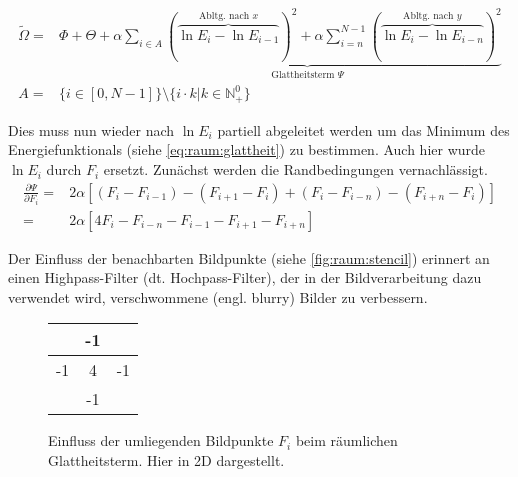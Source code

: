 \begin{align}
\label{eq:raum:glattheit}
\tilde{\Omega} =& 
    \Phi + \Theta +
    \underbrace{
        \alpha \sum_{i\in A}
            (\overbrace{
                \ln E_i - \ln E_{i-1}
            }^{\mbox{Abltg. nach }x}
        )^2
        +\alpha \sum_{i=n}^{N-1}(
            \overbrace{
                \ln E_i - \ln E_{i-n}
            }^{\mbox{Abltg. nach }y}
        )^2
    }_{\mbox{Glattheitsterm }\Psi}\\
    \label{eq:raum:x}
    A=& \{ i \in [0,N-1]\} \setminus \{ i \cdot k | k \in \mathbb{N}_+^0 \}
\end{align}

Dies muss nun wieder nach $\ln E_i$ partiell abgeleitet werden um das Minimum des Energiefunktionals (siehe \autoref{eq:raum:glattheit}) zu bestimmen. Auch hier wurde $\ln E_i$ durch $F_i$ ersetzt. Zunächst werden die Randbedingungen vernachlässigt.
\begin{align}
\label{eq:raum:derivate}
\frac{\partial \Psi}{\partial F_i} =& 2\alpha[(F_i - F_{i-1}) - (F_{i+1} - F_i) + (F_i - F_{i-n})-(F_{i+n}- F_i)]\\
=&2\alpha[4 F_i-F_{i-n} - F_{i-1} - F_{i+1} - F_{i+n}]
\end{align}


Der Einfluss der benachbarten Bildpunkte (siehe \autoref{fig:raum:stencil}) erinnert an einen Highpass-Filter (dt. Hochpass-Filter), der in der Bildverarbeitung dazu verwendet wird, verschwommene (engl. blurry) Bilder zu verbessern.

\begin{figure}[h]
  \begin{center}
    \begin{tabular}{c|c|c}
        \cline{2-2}
        & -1 & \\
        \hline
        \multicolumn{1}{|c|}{-1}
        & 4 & \multicolumn{1}{c|}{-1}\\
        \hline
        & -1 & \\
        \cline{2-2} 
    \end{tabular}
  \end{center}
\caption{Einfluss der umliegenden Bildpunkte $F_i$ beim räumlichen Glattheitsterm. Hier in 2D dargestellt.}
\label{fig:raum:stencil}
\end{figure}

